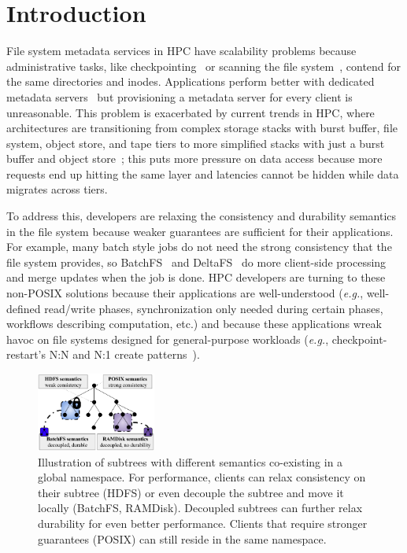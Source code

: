 \section{Introduction}

File system metadata services in HPC have scalability problems because
administrative tasks, like checkpointing~\cite{bent_plfs_2009} or scanning the
file system~\cite{zheng:pdsw2014-batchfs}, contend for the same directories and
inodes. Applications perform better with dedicated metadata
servers~\cite{sevilla:sc15-mantle, ren:sc2014-indexfs} but provisioning a
metadata server for every client is unreasonable. This problem is exacerbated
by current trends in HPC, where architectures are transitioning from complex
storage stacks with burst buffer, file system, object store, and tape tiers to
more simplified stacks with just a burst buffer and object
store~\cite{bent:login16-hpc-trends}; this puts more pressure on data access
because more requests end up hitting the same layer and latencies cannot be
hidden while data migrates across tiers.

To address this, developers are relaxing the consistency and durability
semantics in the file system because weaker guarantees are sufficient for their
applications. For example, many batch style jobs do not need the strong
consistency that the file system provides, so
BatchFS~\cite{zheng:pdsw2014-batchfs} and DeltaFS~\cite{zheng:pdsw2015-deltafs}
do more client-side processing and merge updates when the job is done. HPC
developers are turning to these non-POSIX solutions because their applications
are well-understood ({\it e.g.}, well-defined read/write phases,
synchronization only needed during certain phases, workflows describing
computation, etc.) and because these applications wreak havoc on file systems designed for
general-purpose workloads ({\it e.g.}, checkpoint-restart's N:N and N:1 create
patterns~\cite{bent_plfs_2009}).

\begin{figure}[tb]
\centering
\includegraphics[width=0.35\textwidth]{figures/subtree-policies1.png}
\caption{ Illustration of subtrees with different semantics co-existing in a
global namespace.  For performance, clients can relax consistency on their
subtree (HDFS) or even decouple the subtree and move it locally (BatchFS,
RAMDisk). Decoupled subtrees can further relax durability for even better
performance.  Clients that require stronger guarantees (POSIX) can still reside
in the same namespace.  }\label{fig:subtree-policies}
\end{figure}

